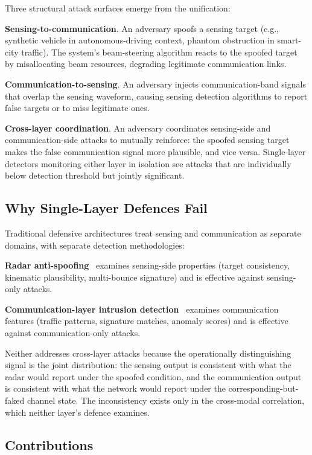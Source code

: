 \documentclass[sigconf,nonacm]{acmart}
\begin{document}
Three structural attack surfaces emerge from the unification:

\textbf{Sensing-to-communication}. An adversary spoofs a sensing
target (e.g., synthetic vehicle in autonomous-driving context,
phantom obstruction in smart-city traffic). The system's beam-steering
algorithm reacts to the spoofed target by misallocating beam
resources, degrading legitimate communication links.

\textbf{Communication-to-sensing}. An adversary injects
communication-band signals that overlap the sensing waveform, causing
sensing detection algorithms to report false targets or to miss
legitimate ones.

\textbf{Cross-layer coordination}. An adversary coordinates
sensing-side and communication-side attacks to mutually reinforce:
the spoofed sensing target makes the false communication signal more
plausible, and vice versa. Single-layer detectors monitoring either
layer in isolation see attacks that are individually below detection
threshold but jointly significant.

\subsection{Why Single-Layer Defences Fail}

Traditional defensive architectures treat sensing and communication
as separate domains, with separate detection methodologies:

\textbf{Radar anti-spoofing}~\cite{krayem2024radarspoofing} examines
sensing-side properties (target consistency, kinematic
plausibility, multi-bounce signature) and is effective against
sensing-only attacks.

\textbf{Communication-layer intrusion detection}~\cite{moustafa2024nidssurv}
examines communication features (traffic patterns, signature
matches, anomaly scores) and is effective against
communication-only attacks.

Neither addresses cross-layer attacks because the operationally
distinguishing signal is the joint distribution: the sensing output
is consistent with what the radar would report under the spoofed
condition, and the communication output is consistent with what the
network would report under the corresponding-but-faked channel
state. The inconsistency exists only in the cross-modal correlation,
which neither layer's defence examines.

\subsection{Contributions}
\end{document}
